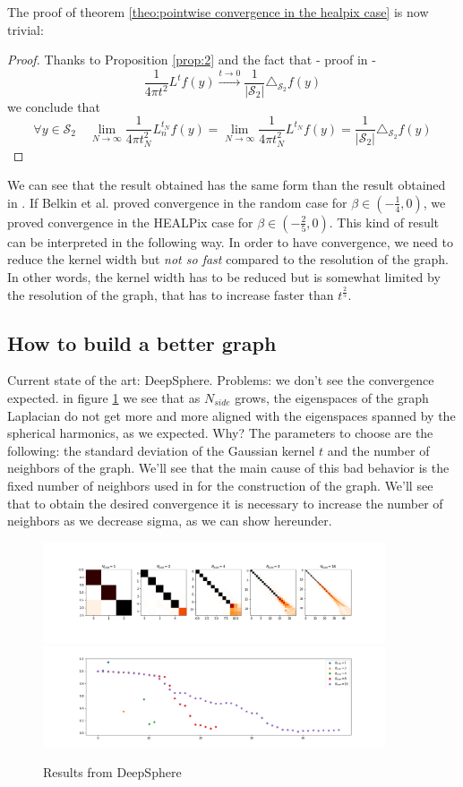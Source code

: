 The proof of theorem \ref{theo:pointwise convergence in the healpix case} is now trivial:
\begin{proof}
	Thanks to Proposition \ref{prop:2} and the fact that - proof in \cite{Belkin:2005:TTF:2138147.2138189} - 
	$$\frac{1}{4\pi t^2} L^tf(y) \xrightarrow{t\to 0 } \frac{1}{|\mathcal S_2|}\triangle_{\mathcal S_2}f(y)$$
	we conclude that
	$$\forall y\in\mathcal S_2 \quad \lim_{N\to\infty}\frac{1}{4\pi t_N^2} L_n^{t_N}f(y) =  \lim_{N\to\infty}\frac{1}{4\pi t_N^2} L^{t_N}f(y) = \frac{1}{|\mathcal S_2|}\triangle_{\mathcal S_2}f(y) $$
\end{proof}
We can see that the result obtained has the same form than the result obtained in \cite{Belkin:2005:TTF:2138147.2138189}. If Belkin et al. proved convergence in the random case for $\beta \in (-\frac{1}{4}, 0)$, we proved convergence in the HEALPix case for $\beta \in (-\frac{2}{5}, 0)$. This kind of result can be interpreted in the following way. In order to have convergence, we need to reduce the kernel width but \textit{not so fast} compared to the resolution of the graph. In other words, the kernel width has to be reduced but is somewhat limited by the resolution of the graph, that has to increase faster than $t^\frac{2}{5}$.
\subsection{How to build a better graph}
Current state of the art: DeepSphere.
Problems: we don't see the convergence expected. in figure \ref{fig:DeepSphere} we see that as $N_{side}$ grows, the eigenspaces of the graph Laplacian do not get more and more aligned with the eigenspaces spanned by the spherical harmonics, as we expected. Why? The parameters to choose are the following: the standard deviation of the Gaussian kernel $t$ and the number of neighbors of the graph. We'll see that the main cause of this bad behavior is the fixed number of neighbors used in \cite{DeepSphere} for the construction of the graph. We'll see that to obtain the desired convergence it is necessary to increase the number of neighbors as we decrease sigma, as we can show hereunder.
\begin{figure}[h]
	\label{fig:DeepSphere}
	\caption{Results from DeepSphere}
	\centering
	\includegraphics[width=0.9\textwidth]{../codes/02.HeatKernelGraphLaplacian/HEALPix/06_figures/deepsphere_original.png}
	\includegraphics[width=0.9\textwidth]{../codes/02.HeatKernelGraphLaplacian/HEALPix/06_figures/deepsphere_original_diagonal.png}	
\end{figure}

